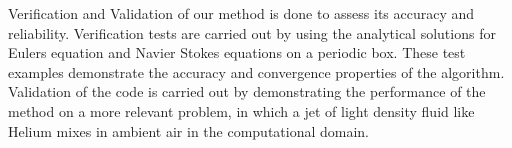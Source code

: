 \documentclass{report}
\begin{document}
Verification and Validation of our method is done to assess its
accuracy and reliability. Verification tests are carried out by using
the analytical solutions for Eulers equation and Navier Stokes
equations on a periodic box. These test examples demonstrate the
accuracy and convergence properties of the algorithm. Validation of the
code is carried out by demonstrating the performance of the method on a
more relevant problem, in which a jet of light density fluid like
Helium mixes in ambient air in the computational domain.
\end{document}
